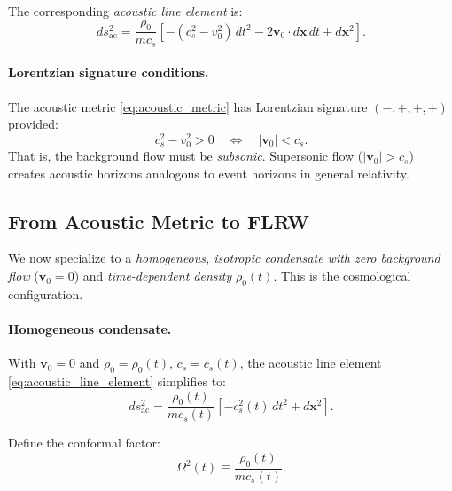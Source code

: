 The corresponding \emph{acoustic line element} is:
\begin{equation}
\label{eq:acoustic_line_element}
\boxed{ds_{\mathrm{ac}}^2 = \frac{\rho_0}{m c_s} \left[ -(c_s^2 - v_0^2) \, dt^2 - 2 \mathbf{v}_0 \cdot d\mathbf{x} \, dt + d\mathbf{x}^2 \right].}
\end{equation}

\paragraph{Lorentzian signature conditions.}
The acoustic metric \eqref{eq:acoustic_metric} has Lorentzian signature $(-,+,+,+)$ provided:
\begin{equation}
\label{eq:Lorentzian_condition}
c_s^2 - v_0^2 > 0 \quad \Longleftrightarrow \quad |\mathbf{v}_0| < c_s.
\end{equation}
That is, the background flow must be \emph{subsonic}. Supersonic flow ($|\mathbf{v}_0| > c_s$) creates acoustic horizons analogous to event horizons in general relativity.

\subsection{From Acoustic Metric to FLRW}
\label{sec:acoustic_to_FLRW}

We now specialize to a \emph{homogeneous, isotropic condensate with zero background flow} ($\mathbf{v}_0 = 0$) and \emph{time-dependent density} $\rho_0(t)$. This is the cosmological configuration.

\paragraph{Homogeneous condensate.}
With $\mathbf{v}_0 = 0$ and $\rho_0 = \rho_0(t)$, $c_s = c_s(t)$, the acoustic line element \eqref{eq:acoustic_line_element} simplifies to:
\begin{equation}
\label{eq:acoustic_homogeneous}
ds_{\mathrm{ac}}^2 = \frac{\rho_0(t)}{m c_s(t)} \left[ -c_s^2(t) \, dt^2 + d\mathbf{x}^2 \right].
\end{equation}

Define the conformal factor:
\begin{equation}
\label{eq:conformal_factor}
\Omega^2(t) \equiv \frac{\rho_0(t)}{m c_s(t)}.
\end{equation}

